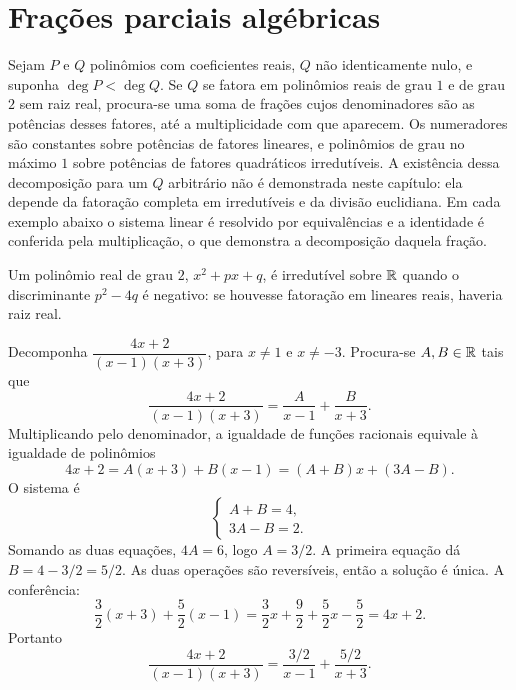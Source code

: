 \documentclass[11pt,a4paper]{article}
\begin{document}
\section{Frações parciais algébricas}

Sejam $P$ e $Q$ polinômios com coeficientes reais, $Q$ não identicamente nulo, e suponha $\deg P<\deg Q$. Se $Q$ se fatora em polinômios reais de grau $1$ e de grau $2$ sem raiz real, procura-se uma soma de frações cujos denominadores são as potências desses fatores, até a multiplicidade com que aparecem. Os numeradores são constantes sobre potências de fatores lineares, e polinômios de grau no máximo $1$ sobre potências de fatores quadráticos irredutíveis. A existência dessa decomposição para um $Q$ arbitrário não é demonstrada neste capítulo: ela depende da fatoração completa em irredutíveis e da divisão euclidiana. Em cada exemplo abaixo o sistema linear é resolvido por equivalências e a identidade é conferida pela multiplicação, o que demonstra a decomposição daquela fração.

Um polinômio real de grau $2$, $x^2+px+q$, é irredutível sobre $\mathbb{R}$ quando o discriminante $p^2-4q$ é negativo: se houvesse fatoração em lineares reais, haveria raiz real.

\begin{exemplo}\label{ex:fp-distintos}
Decomponha $\dfrac{4x+2}{(x-1)(x+3)}$, para $x\neq 1$ e $x\neq -3$. Procura-se $A,B\in\mathbb{R}$ tais que
\[
\frac{4x+2}{(x-1)(x+3)}=\frac{A}{x-1}+\frac{B}{x+3}.
\]
Multiplicando pelo denominador, a igualdade de funções racionais equivale à igualdade de polinômios
\[
4x+2=A(x+3)+B(x-1)=(A+B)x+(3A-B).
\]
O sistema é
\begin{equation}
\begin{cases}
A+B=4,\\
3A-B=2.
\end{cases}
\label{eq:fp-distintos}
\end{equation}
Somando as duas equações, $4A=6$, logo $A=3/2$. A primeira equação dá $B=4-3/2=5/2$. As duas operações são reversíveis, então a solução é única. A conferência:
\[
\frac{3}{2}(x+3)+\frac{5}{2}(x-1)
=\frac{3}{2}x+\frac{9}{2}+\frac{5}{2}x-\frac{5}{2}
=4x+2.
\]
Portanto
\[
\frac{4x+2}{(x-1)(x+3)}=\frac{3/2}{x-1}+\frac{5/2}{x+3}.
\]
\end{exemplo}
\end{document}
